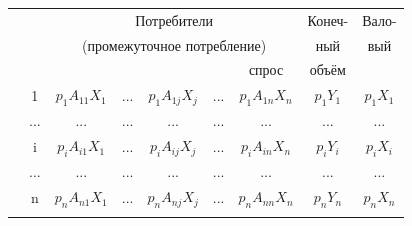 \documentclass[12pt, 4paper]{book}
\begin{document}
{\newpage
\begin{table}[h]
	\centering
	\begin{tabular}[center]{|p{0.2in}|p{0.2in}|p{1in}|p{0.2in}|p{1in}|p{0.2in}|p{1in}|p{0.3in}|p{0.3in}|}
		\hline
		\multicolumn{2}{|c|}{\multirow{2}{*}{}} & \multicolumn{5}{c|}{{\small Потребители}} &\multicolumn{1}{c|}{{\small Конеч-}} & \multicolumn{1}{c|}{{\small Вало-}}  \\
		\multicolumn{2}{|c|}{\multirow{2}{*}{}} & \multicolumn{5}{c|}{{\small (промежуточное потребление)}} & \multicolumn{1}{c|}{{\small ный}} & \multicolumn{1}{c|}{{\small вый}} \\ \hhline{~~-----~} 
		\multicolumn{2}{|c|}{\multirow{2}{*}{}} & \centering {1} & \centering {...} & \centering {j} & \centering {...}  & \centering {n} & \multicolumn{1}{c|}{{\small спрос}} & \multicolumn{1}{c|}{{\small объём}}\\ \hline
		\multicolumn{1}{|c|}{} & \multicolumn{1}{c|}{1}  & \multicolumn{1}{c|}{$p_1A_{11}X_1$} & \multicolumn{1}{c|}{...} & \multicolumn{1}{c|}{$p_1A_{1j}X_j$} & \multicolumn{1}{c|}{...} & \multicolumn{1}{c|}{$p_1A_{1n}X_n$}& \multicolumn{1}{c|}{$ p_1Y_1 $} & \multicolumn{1}{c|}{$ p_1X_1 $}\\  \hhline{~--------}
		\multicolumn{1}{|c|}{} & \multicolumn{1}{c|}{...}  & \multicolumn{1}{c|}{...} & \multicolumn{1}{c|}{...} & \multicolumn{1}{c|}{...} & \multicolumn{1}{c|}{...} & \multicolumn{1}{c|}{...}& \multicolumn{1}{c|}{...} & \multicolumn{1}{c|}{...}\\  \hhline{~--------}
		\multicolumn{1}{|c|}{} & \multicolumn{1}{c|}{i}  & \multicolumn{1}{c|}{$p_iA_{i1}X_1$} & \multicolumn{1}{c|}{...} & \multicolumn{1}{c|}{$p_iA_{ij}X_j$} & \multicolumn{1}{c|}{...} & \multicolumn{1}{c|}{$p_iA_{in}X_n$}& \multicolumn{1}{c|}{$ p_iY_i $} & \multicolumn{1}{c|}{$p_iX_i$}\\  \hhline{~--------} 
		\multicolumn{1}{|c|}{} & \multicolumn{1}{c|}{...}  & \multicolumn{1}{c|}{...} & \multicolumn{1}{c|}{...} & \multicolumn{1}{c|}{...} & \multicolumn{1}{c|}{...} & \multicolumn{1}{c|}{...}& \multicolumn{1}{c|}{...} & \multicolumn{1}{c|}{...}\\  \hhline{~--------} 
		\multicolumn{1}{|c|}{} & \multicolumn{1}{c|}{n}  & \multicolumn{1}{c|}{$p_nA_{n1}X_1$} & \multicolumn{1}{c|}{...} & \multicolumn{1}{c|}{$p_nA_{nj}X_j$} & \multicolumn{1}{c|}{...} & \multicolumn{1}{c|}{$p_nA_{nn}X_n$}& \multicolumn{1}{c|}{$p_nY_n$} & \multicolumn{1}{c|}{$p_nX_n$}\\ \hhline{---------} 

\end{tabular}
\end{table}}
\end{document}
